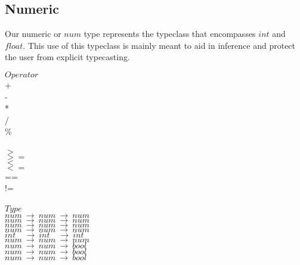 ﻿\documentclass[5pt]{article}
\begin{document}
\subsection{Numeric}
Our numeric or $num$ type represents the typeclass that encompasses $int$ and $float$. This use of this typeclass is mainly meant to aid in inference and protect the user from explicit typecasting.
\begin{multicols}{3}
\noindent $Operator$ \\
\hspace*{5mm} + \\
\hspace*{5mm} - \\
\hspace*{5mm} * \\
\hspace*{5mm} / \\
\hspace*{5mm} \% \\
\hspace*{5mm} \^ \\
\hspace*{5mm} $>$ \\
\hspace*{5mm} $>=$ \\
\hspace*{5mm} $<$ \\
\hspace*{5mm} $<=$ \\
\hspace*{5mm} == \\
\hspace*{5mm} != \\
\columnbreak \\
\noindent $Type$ \\
$num \ \rightarrow \ num \ \rightarrow \ num $ \\
$num \ \rightarrow \ num \ \rightarrow \ num $ \\
$num \ \rightarrow \ num \ \rightarrow \ num $ \\
$num \ \rightarrow \ num \ \rightarrow \ num $ \\
$int \quad \rightarrow \ int \quad \rightarrow \ int $ \\
$num \ \rightarrow \ num \ \rightarrow \ num $ \\
$num \ \rightarrow \ num \ \rightarrow \ bool $ \\
$num \ \rightarrow \ num \ \rightarrow \ bool $ \\
$num \ \rightarrow \ num \ \rightarrow \ bool $ \\

\end{multicols}
\end{document}
